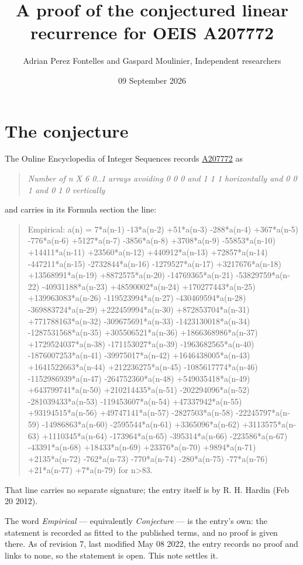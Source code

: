 \documentclass[11pt]{article}
\title{A proof of the conjectured linear recurrence for OEIS A207772}
\author{Adrian Perez Fontelles and Gaspard Moulinier, Independent researchers}
\date{09 September 2026}
\theoremstyle{definition}
\begin{document}
\maketitle
\section{The conjecture}

The Online Encyclopedia of Integer Sequences records \href{https://oeis.org/A207772}{A207772} as

\begin{quote}\itshape Number of n X 6 0..1 arrays avoiding 0 0 0 and 1 1 1 horizontally and 0 0 1 and 0 1 0 vertically\end{quote}

and carries in its Formula section the line:

\begin{quote}\ttfamily Empirical: a(n) = 7*a(n-1) -13*a(n-2) +51*a(n-3) -288*a(n-4) +367*a(n-5) -776*a(n-6) +5127*a(n-7) -3856*a(n-8) +3708*a(n-9) -55853*a(n-10) +14411*a(n-11) +23560*a(n-12) +440912*a(n-13) +72857*a(n-14) -447211*a(n-15) -2732844*a(n-16) -1279527*a(n-17) +3217676*a(n-18) +13568991*a(n-19) +8872575*a(n-20) -14769365*a(n-21) -53829759*a(n-22) -40931188*a(n-23) +48590002*a(n-24) +170277443*a(n-25) +139963083*a(n-26) -119523994*a(n-27) -430469594*a(n-28) -369883724*a(n-29) +222459994*a(n-30) +872853704*a(n-31) +771788163*a(n-32) -309675691*a(n-33) -1423130018*a(n-34) -1287531568*a(n-35) +305506521*a(n-36) +1866368986*a(n-37) +1729524037*a(n-38) -171153027*a(n-39) -1963682565*a(n-40) -1876007253*a(n-41) -39975017*a(n-42) +1646438005*a(n-43) +1641522663*a(n-44) +212236275*a(n-45) -1085617774*a(n-46) -1152986939*a(n-47) -264752360*a(n-48) +549035418*a(n-49) +643799741*a(n-50) +210214435*a(n-51) -202294096*a(n-52) -281039433*a(n-53) -119453607*a(n-54) +47337942*a(n-55) +93194515*a(n-56) +49747141*a(n-57) -2827503*a(n-58) -22245797*a(n-59) -14986863*a(n-60) -2595544*a(n-61) +3365096*a(n-62) +3113575*a(n-63) +1110345*a(n-64) -173964*a(n-65) -395314*a(n-66) -223586*a(n-67) -43391*a(n-68) +18433*a(n-69) +23376*a(n-70) +9894*a(n-71) +2135*a(n-72) -762*a(n-73) -770*a(n-74) -280*a(n-75) -77*a(n-76) +21*a(n-77) +7*a(n-79) for n>83.\end{quote}

That line carries no separate signature; the entry itself is by R. H. Hardin (Feb 20 2012).

The word {\itshape Empirical} --- equivalently {\itshape Conjecture} --- is the entry's own: the statement is recorded as fitted to the published terms, and no proof is given there. As of revision 7, last modified May 08 2022, the entry records no proof and links to none, so the statement is open. This note settles it.
\end{document}
